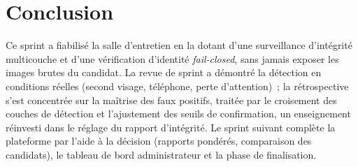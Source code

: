 \section{Conclusion}

Ce sprint a fiabilisé la salle d'entretien en la dotant d'une surveillance d'intégrité multicouche et d'une vérification d'identité \textit{fail-closed}, sans jamais exposer les images brutes du candidat. La revue de sprint a démontré la détection en conditions réelles (second visage, téléphone, perte d'attention)~; la rétrospective s'est concentrée sur la maîtrise des faux positifs, traitée par le croisement des couches de détection et l'ajustement des seuils de confirmation, un enseignement réinvesti dans le réglage du rapport d'intégrité. Le sprint suivant complète la plateforme par l'aide à la décision (rapports pondérés, comparaison des candidats), le tableau de bord administrateur et la phase de finalisation.
